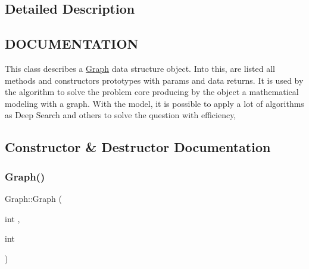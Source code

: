 

\subsection{Detailed Description}
\hypertarget{classScreen_CLASS}{}\subsection{D\+O\+C\+U\+M\+E\+N\+T\+A\+T\+I\+ON}\label{classScreen_CLASS}
This class describes a \hyperlink{classGraph}{Graph} data structure object. Into this, are listed all methods and constructors prototypes with params and data returns. It is used by the algorithm to solve the problem core producing by the object a mathematical modeling with a graph. With the model, it is possible to apply a lot of algorithms as Deep Search and others to solve the question with efficiency, 

\subsection{Constructor \& Destructor Documentation}
\mbox{\label{classGraph_aad32f8d35016150b565c891e79e70f15}} 
\subsubsection{\texorpdfstring{Graph()}{Graph()}\hspace{0.1cm}{\footnotesize\ttfamily [1/2]}}
{\footnotesize\ttfamily Graph\+::\+Graph (\begin{DoxyParamCaption}\item[{int}]{,  }\item[{int}]{ }\end{DoxyParamCaption})}




